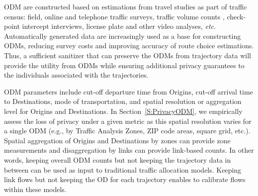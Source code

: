 \documentclass[times,twocolumn,final,authoryear]{elsarticle}
\begin{document}
\begin{table}[]
\caption{An Origin Destination Matrix from a spatial interaction survey}
\centering

\label{table:ODMeg} 
\end{table}

ODM are constructed based on estimations from travel studies as part of traffic census: field, online and telephone traffic surveys, traffic volume counts \citep{robillard1975}, check-point intercept interviews, license plate and other video analyses, {\it etc}.  
Automatically generated data \citep[e.g. CDR]{iqbal2014} are increasingly used as a base for constructing ODMs, reducing survey costs and improving accuracy of route choice estimations. 
Thus, a sufficient sanitizer that can preserve the ODMs from trajectory data will provide the utility from ODMs while ensuring additional privacy guarantees to the individuals associated with the trajectories. 

ODM parameters include cut-off departure time from Origins, cut-off arrival time to Destinations, mode of transportation, and spatial resolution or aggregation level for Origins and Destinations. 
In Section~\ref{S:PrivacyODM}, we empirically assess the loss of privacy under a given metric as this spatial resolution varies for a single ODM (e.g., by Traffic Analysis Zones, ZIP code areas, square grid, etc.). Spatial aggregation of Origins and Destinations by zones can provide zone measurements and disaggregation by links can provide link-based counts. 
In other words, keeping overall ODM counts but not keeping the trajectory data in between can be used as input to traditional traffic allocation models. Keeping link flows but not keeping the OD for each trajectory enables to calibrate flows within these models.
\end{document}
